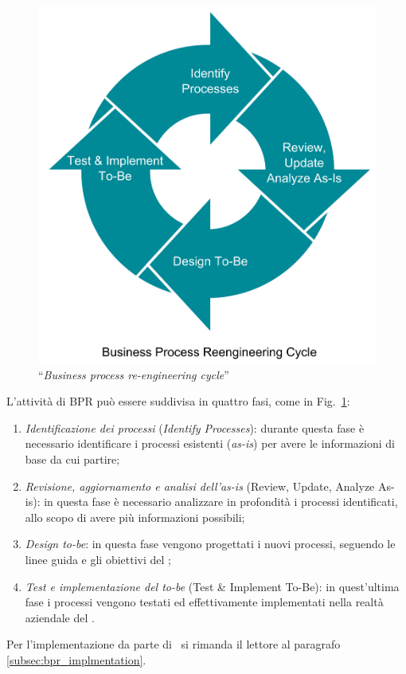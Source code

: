 		\begin{figure}[H]
			\centering
			\includegraphics[width=\linewidth-2cm]{img/bpr}
			\caption{``\textit{Business process re-engineering cycle}''\cite{bpr}}
			\label{fig:bpr}
		\end{figure}
	
		L'attività di BPR può essere suddivisa in quattro fasi, come in Fig.~\ref{fig:bpr}:
		\begin{enumerate}
			\item \textit{Identificazione dei processi} (\textit{Identify Processes}): durante questa fase è necessario identificare i processi esistenti (\textit{as-is}) per avere le informazioni di base da cui partire;
			\item \textit{Revisione, aggiornamento e analisi dell’as-is} (Review, Update, Analyze As-is): in questa fase è necessario analizzare in profondità i processi identificati, allo scopo di avere più informazioni possibili;
			\item \textit{Design to-be}: in questa fase vengono progettati i nuovi processi, seguendo le linee guida e gli obiettivi del \proponente;
			\item \textit{Test e implementazione del to-be} (Test \& Implement To-Be): in quest’ultima fase i processi vengono testati ed effettivamente implementati nella realtà aziendale del \proponente.
		\end{enumerate}

		Per l'implementazione da parte di \azienda~si rimanda il lettore al paragrafo \ref{subsec:bpr_implmentation}.
